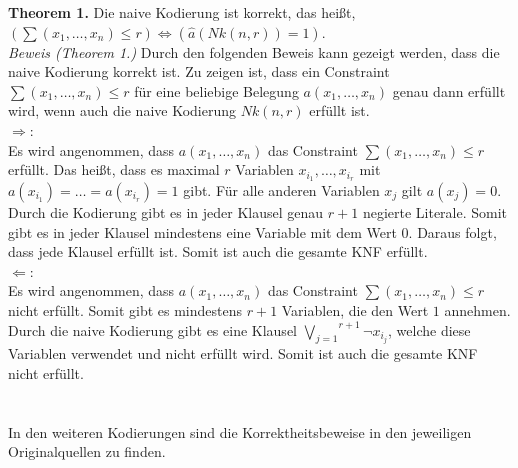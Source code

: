 \documentclass[a4,abstract=on]{scrartcl}
\begin{document}
\textbf{Theorem 1.} Die naive Kodierung ist korrekt, das heißt, $(\sum (x_1, \dots, x_n)\allowbreak \leq r) \Leftrightarrow (\hat{a} (Nk(n,r)) = 1)$.\\
\newline
\textit{Beweis (Theorem 1.)} Durch den folgenden Beweis kann gezeigt werden, dass die naive Kodierung korrekt ist. Zu zeigen ist, dass ein Constraint $\sum(x_1, \dots,x_n) \leq r$ für eine beliebige Belegung $a(x_1, \dots ,x_n)$ genau dann erfüllt wird, wenn auch die naive Kodierung $Nk(n, r)$ erfüllt ist.\\
\glqq$\Rightarrow$\grqq:\\
Es wird angenommen, dass $a(x_1, \dots ,x_n)$ das Constraint $\sum(x_1, \dots,x_n)\allowbreak \leq r$ erfüllt. Das heißt, dass es maximal $r$ Variablen $x_{i_1}, \dots, x_{i_r}$ mit $a(x_{i_1}) =\allowbreak \dots = a(x_{i_r}) = 1$ gibt. Für alle anderen Variablen $x_j$ gilt $a(x_j) = 0$. Durch die Kodierung gibt es in jeder Klausel genau $r+1$ negierte Literale. Somit gibt es in jeder Klausel mindestens eine Variable mit dem Wert $0$. Daraus folgt, dass jede Klausel erfüllt ist. Somit ist auch die gesamte KNF erfüllt.\\
\glqq$\Leftarrow$\grqq:\\
Es wird angenommen, dass $a(x_1, \dots ,x_n)$ das Constraint $\sum(x_1, \dots,x_n)\allowbreak \leq r$ nicht erfüllt. Somit gibt es mindestens $r+1$ Variablen, die den Wert $1$ annehmen. Durch die naive Kodierung gibt es eine Klausel $\overset{r+1}{\underset{j=1}{\bigvee}} {\neg x_{i_j}}$, welche diese Variablen verwendet und nicht erfüllt wird. Somit ist auch die gesamte KNF nicht erfüllt.\\
 \qedsymbol \\
\ \\
In den weiteren Kodierungen sind die Korrektheitsbeweise in den jeweiligen Originalquellen zu finden.
\end{document}
